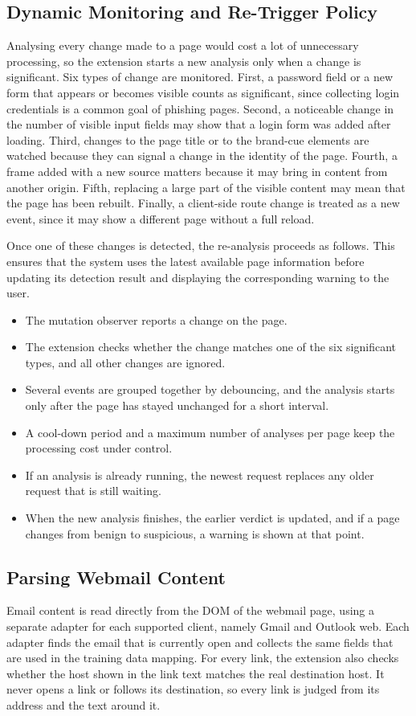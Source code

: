 \documentclass{FastFyp}
\begin{document}
\subsection{Dynamic Monitoring and Re-Trigger Policy}
\label{sec:dynamic-trigger}
Analysing every change made to a page would cost a lot of unnecessary processing, so the extension starts a new analysis only when a change is significant. Six types of change are monitored. First, a password field or a new form that appears or becomes visible counts as significant, since collecting login credentials is a common goal of phishing pages. Second, a noticeable change in the number of visible input fields may show that a login form was added after loading. Third, changes to the page title or to the brand-cue elements are watched because they can signal a change in the identity of the page. Fourth, a frame added with a new source matters because it may bring in content from another origin. Fifth, replacing a large part of the visible content may mean that the page has been rebuilt. Finally, a client-side route change is treated as a new event, since it may show a different page without a full reload.

Once one of these changes is detected, the re-analysis proceeds as follows. This ensures that the system uses the latest available page information before updating its detection result and displaying the corresponding warning to the user.
\begin{itemize}
    \item The mutation observer reports a change on the page.
    \item The extension checks whether the change matches one of the six significant types, and all other changes are ignored.
    \item Several events are grouped together by debouncing, and the analysis starts only after the page has stayed unchanged for a short interval.
    \item A cool-down period and a maximum number of analyses per page keep the processing cost under control.
    \item If an analysis is already running, the newest request replaces any older request that is still waiting.
    \item When the new analysis finishes, the earlier verdict is updated, and if a page changes from benign to suspicious, a warning is shown at that point.
\end{itemize}

\subsection{Parsing Webmail Content}
\label{sec:email-parsing}
Email content is read directly from the DOM of the webmail page, using a separate adapter for each supported client, namely Gmail and Outlook web. Each adapter finds the email that is currently open and collects the same fields that are used in the training data mapping. For every link, the extension also checks whether the host shown in the link text matches the real destination host. It never opens a link or follows its destination, so every link is judged from its address and the text around it.
\end{document}
